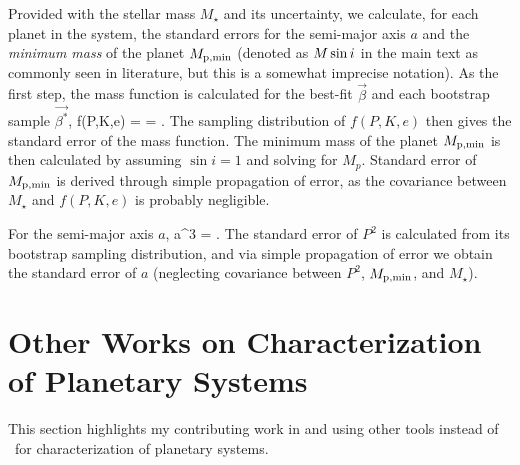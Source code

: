 Provided with the stellar mass $M_\star$ and its uncertainty, we
calculate, for each planet in the system, the standard errors for the
semi-major axis $a$ and the {\it minimum mass} of the planet $M_{\rm
  p,min}$ (denoted as $M\sin{i}$ in the main text as commonly seen in
literature, but this is a somewhat imprecise notation). As the first
step, the mass function is calculated for the best-fit $\vec{\beta}$
and each bootstrap sample $\vec{\beta^*}$,
\beq
f(P,K,e) =  = .
\eeq
The sampling distribution of $f(P,K,e)$ then gives the standard error
of the mass function. The minimum mass of the planet $M_{\rm p,min}$ 
is then calculated by assuming $\sin{i}=1$ and solving for $M_p$.
Standard error of $M_{\rm p,min}$ is derived through simple
propagation of error, as the covariance between $M_\star$ and
$f(P,K,e)$ is probably negligible.

For the semi-major axis $a$,
\beq
a^3 =  \approx {}.
\eeq
The standard error of $P^2$ is calculated from its bootstrap sampling
distribution, and via simple propagation of error we obtain the
standard error of $a$ (neglecting covariance between $P^2$, $M_{\rm
  p,min}$, and $M_\star$).


\section{Other Works on Characterization of Planetary Systems}

This section highlights my contributing work in
\cite{2015ApJ...800...22F} and \cite{2013ApJ...768..155H} using other
tools instead of \boottran\ for characterization of planetary systems.

